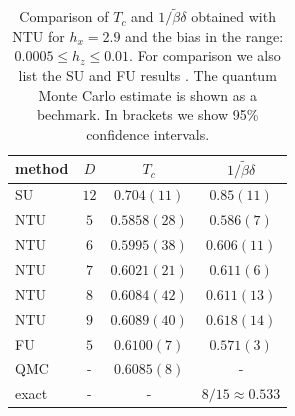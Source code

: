 \documentclass[prb,twocolumn,showkeys,showpacs,amsmath,amsfonts,floatfix,superscriptaddress,nofootinbib]{revtex4-1}
\begin{document}
\begin{table}[t!]
\begin{tabular}{|l|c|c|c|}
\hline
method & $D$ & $T_c$ & $1/\tilde\beta\delta$ \\ 
\hline
SU\cite{CzarnikDziarmagaCorboz} & $12$ & $0.704(11)$ & $0.85(11)$ \\
\hline
  NTU  & $5$  &  $0.5858(28)$ & $0.586(7)$ \\ 
  NTU  & $6$  &  $0.5995(38)$ & $0.606(11)$ \\   
  NTU  & $7$  &  $0.6021(21)$ & $0.611(6)$ \\   
  NTU  & $8$  &  $0.6084(42)$ & $0.611(13)$ \\ 
  NTU  & $9$  &  $0.6089(40)$ & $0.618(14)$ \\ 
\hline   
FU\cite{CzarnikDziarmagaCorboz} & $5$ & $0.6100(7)$ & $0.571(3)$ \\
\hline
QMC\cite{Hesselmann_TIsingQMC_16} & - & $0.6085(8)$ & - \\
\hline
exact & - & - & $8/15 \approx 0.533$\\
\hline
\end{tabular}
\caption{
Comparison of $T_c$ and $1/\tilde\beta\delta$ obtained with NTU for $h_x=2.9$ and the bias in the range: $0.0005 \le h_z \le 0.01$. 
For comparison we also list the SU and FU results \cite{CzarnikDziarmagaCorboz}.
The quantum Monte Carlo estimate \cite{Hesselmann_TIsingQMC_16} is shown as a bechmark.
In brackets we show 95\% confidence intervals. 
}
\label{tab:29}
\end{table}
\end{document}
